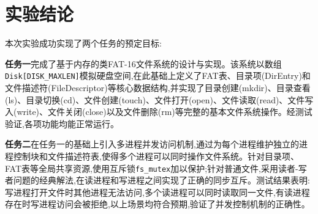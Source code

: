 \section{实验结论}
本次实验成功实现了两个任务的预定目标:

\textbf{任务一}完成了基于内存的类FAT-16文件系统的设计与实现。该系统以数组\texttt{Disk[DISK\_MAXLEN]}模拟硬盘空间,在此基础上定义了FAT表、目录项(DirEntry)和文件描述符(FileDescriptor)等核心数据结构,并实现了目录创建(mkdir)、目录查看(ls)、目录切换(cd)、文件创建(touch)、文件打开(open)、文件读取(read)、文件写入(write)、文件关闭(close)以及文件删除(rm)等完整的基本文件系统操作。经测试验证,各项功能均能正常运行。

\textbf{任务二}在任务一的基础上引入多进程并发访问机制,通过为每个进程维护独立的进程控制块和文件描述符表,使得多个进程可以同时操作文件系统。针对目录项、FAT表等全局共享资源,使用互斥锁\texttt{fs\_mutex}加以保护;针对普通文件,采用读者-写者问题的经典解法,在读进程和写进程之间实现了正确的同步互斥。测试结果表明:写进程打开文件时其他进程无法访问,多个读进程可以同时读取同一文件,有读进程存在时写进程访问会被拒绝,以上场景均符合预期,验证了并发控制机制的正确性。
